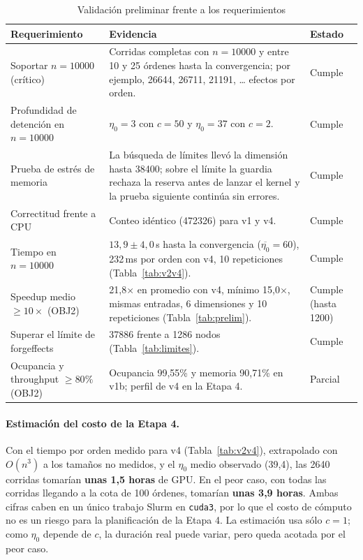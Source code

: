 \documentclass[11pt,a4paper]{article}
\begin{document}
\begin{table}[h]
\centering
\caption{Validación preliminar frente a los requerimientos}\label{tab:validacion}
\begin{tabular}{p{4.3cm}p{6.6cm}p{2.6cm}}
\toprule
\textbf{Requerimiento} & \textbf{Evidencia} & \textbf{Estado}\\
\midrule
Soportar $n=\num{10000}$ (crítico) &
Corridas completas con $n=\num{10000}$ y entre 10 y 25 órdenes hasta la convergencia;
por ejemplo, \num{26644}, \num{26711},
\num{21191}, \ldots{} efectos por orden. & Cumple\\
\addlinespace
Profundidad de detención en $n=\num{10000}$ &
$\eta_0 = 3$ con $c=50$ y $\eta_0 = 37$ con $c=2$. & Cumple\\
\addlinespace
Prueba de estrés de memoria &
La búsqueda de límites llevó la dimensión hasta \num{38400}; sobre el límite la guardia
rechaza la reserva antes de lanzar el kernel y la prueba siguiente continúa sin errores.
& Cumple\\
\addlinespace
Correctitud frente a CPU &
Conteo idéntico (\num{472326}) para v1 y v4. & Cumple\\
\addlinespace
Tiempo en $n=\num{10000}$ &
$13{,}9 \pm 4{,}0$\,s hasta la convergencia ($\overline{\eta_0}=60$), 232\,ms por orden con v4,
10 repeticiones (Tabla~\ref{tab:v2v4}). & Cumple\\
\addlinespace
Speedup medio $\geq 10\times$ (OBJ2) &
21,8$\times$ en promedio con v4, mínimo 15,0$\times$, mismas entradas, 6 dimensiones y 10
repeticiones (Tabla~\ref{tab:prelim}). & Cumple (hasta \num{1200})\\
\addlinespace
Superar el límite de forgeffects &
\num{37886} frente a \num{1286} nodos (Tabla~\ref{tab:limites}). & Cumple\\
\addlinespace
Ocupancia y throughput $\geq 80\%$ (OBJ2) &
Ocupancia 99,55\% y memoria 90,71\% en v1b; perfil de v4 en la Etapa 4. & Parcial\\
\bottomrule
\end{tabular}
\end{table}

\paragraph{Estimación del costo de la Etapa 4.}
Con el tiempo por orden medido para v4 (Tabla~\ref{tab:v2v4}), extrapolado con $O(n^3)$ a los
tamaños no medidos, y el $\eta_0$ medio observado (39,4), las \num{2640} corridas tomarían
\textbf{unas 1,5 horas} de GPU. En el peor caso, con todas las corridas llegando a la cota de
100 órdenes, tomarían \textbf{unas 3,9 horas}. Ambas cifras caben en un único trabajo Slurm en
\texttt{cuda3}, por lo que el costo de cómputo no es un riesgo para la planificación de la
Etapa 4. La estimación usa sólo $c=1$; como $\eta_0$ depende de $c$, la duración real puede
variar, pero queda acotada por el peor caso.
\end{document}
